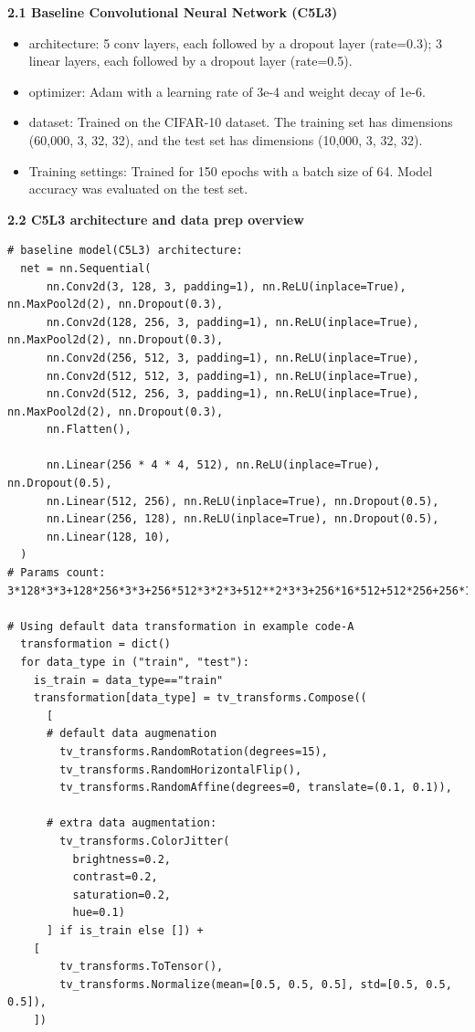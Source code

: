 \documentclass{article}
\begin{document}
\noindent \textbf{2.1 Baseline Convolutional Neural Network (C5L3) }
\begin{itemize}
  \item   architecture:  5 conv layers, each followed by a dropout layer (rate=0.3); 3 linear layers, each followed by a dropout layer (rate=0.5).
  \item   optimizer: Adam with a learning rate of 3e-4 and weight decay of 1e-6.
  \item   dataset: Trained on the CIFAR-10 dataset. The training set has dimensions (60,000, 3, 32, 32), and the test set has dimensions (10,000, 3, 32, 32).
  \item   Training settings: Trained for 150 epochs with a batch size of 64. Model accuracy was evaluated on the test set.
\end{itemize}
\vspace{5mm}
\noindent \textbf{2.2 C5L3 architecture and data prep overview}
\begin{verbatim}
# baseline model(C5L3) architecture:  
  net = nn.Sequential(
      nn.Conv2d(3, 128, 3, padding=1), nn.ReLU(inplace=True), nn.MaxPool2d(2), nn.Dropout(0.3),
      nn.Conv2d(128, 256, 3, padding=1), nn.ReLU(inplace=True), nn.MaxPool2d(2), nn.Dropout(0.3),
      nn.Conv2d(256, 512, 3, padding=1), nn.ReLU(inplace=True),
      nn.Conv2d(512, 512, 3, padding=1), nn.ReLU(inplace=True),
      nn.Conv2d(512, 256, 3, padding=1), nn.ReLU(inplace=True), nn.MaxPool2d(2), nn.Dropout(0.3),
      nn.Flatten(),

      nn.Linear(256 * 4 * 4, 512), nn.ReLU(inplace=True), nn.Dropout(0.5),
      nn.Linear(512, 256), nn.ReLU(inplace=True), nn.Dropout(0.5),
      nn.Linear(256, 128), nn.ReLU(inplace=True), nn.Dropout(0.5),
      nn.Linear(128, 10),
  )
# Params count: 3*128*3*3+128*256*3*3+256*512*3*2*3+512**2*3*3+256*16*512+512*256+256*128+1280=7.28M

# Using default data transformation in example code-A
  transformation = dict()
  for data_type in ("train", "test"):
    is_train = data_type=="train"
    transformation[data_type] = tv_transforms.Compose((
      [
      # default data augmenation
        tv_transforms.RandomRotation(degrees=15),
        tv_transforms.RandomHorizontalFlip(),
        tv_transforms.RandomAffine(degrees=0, translate=(0.1, 0.1)),
      
      # extra data augmentation:
        tv_transforms.ColorJitter(
          brightness=0.2, 
          contrast=0.2,
          saturation=0.2,
          hue=0.1)
      ] if is_train else []) + 
    [
        tv_transforms.ToTensor(),
        tv_transforms.Normalize(mean=[0.5, 0.5, 0.5], std=[0.5, 0.5, 0.5]),
    ])
  \end{verbatim}
\end{document}
